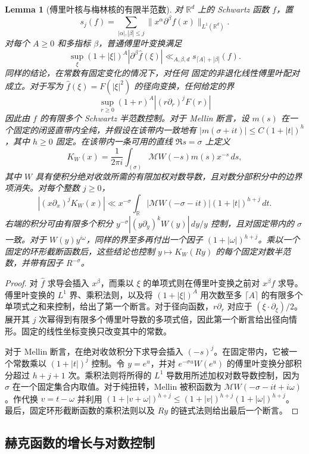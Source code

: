 \documentclass[11pt,a4paper]{article}
\numberwithin{equation}{section}
\numberwithin{figure}{section}
\newtheorem{lemma}[theorem]{Lemma}
\theoremstyle{definition}
\theoremstyle{remark}
\begin{document}
\begin{lemma}[傅里叶核与梅林核的有限半范数]
\label{lem:kernel-seminorms}
对 $\mathbb R^d$ 上的 Schwartz 函数 $f$，置
\[
 s_j(f)=\sum_{|\alpha|,|\beta|\le j}
             \|x^\alpha\partial^\beta f(x)\|_{L^1(\mathbb R^d)}.
\]
对每个 $A\ge0$ 和多指标 $\beta$，普通傅里叶变换满足
\[
 \sup_\xi(1+|\xi|)^A|\partial^\beta\widehat f(\xi)|
 \ll_{A,\beta,d}s_{\lceil A\rceil+|\beta|}(f).
\]
同样的结论，在常数有固定变化的情况下，对任何
固定的非退化线性傅里叶配对成立。对于写为
$\widehat f(\xi)=F(|\xi|^2)$ 的径向变换，任何给定的界
\[
 \sup_{r\ge0}(1+r)^A|(r\partial_r)^jF(r)|
\]
因此由 $f$ 的有限多个 Schwartz 半范数控制。对于 Mellin 断言，设 $m(s)$ 在一个固定的闭竖直带内全纯，并假设在该带内一致地有
$|m(\sigma+it)|\le C(1+|t|)^h$，其中 $h\ge0$ 固定。在该带内一条可用的直线
$\Re s=\sigma$ 上定义
\[
 K_W(x)=\frac1{2\pi i}\int_{(\sigma)}\mathcal MW(-s)m(s)x^{-s}\,ds,
\]
其中 $W$ 具有使积分绝对收敛所需的有限加权对数导数，且对数分部积分中的边界项消失。对每个整数 $j\ge0$，
\[
 |(x\partial_x)^jK_W(x)|
 \ll x^{-\sigma}\int_{\mathbb R}
       |\mathcal MW(-\sigma-it)|(1+|t|)^{h+j}\,dt.
\]
右端的积分可由有限多个积分
$y^{-\sigma}|(y\partial_y)^kW(y)|\,dy/y$ 控制，且对固定带内的 $\sigma$ 一致。对于 $W(y)y^{i\omega}$，同样的界至多再付出一个因子 $(1+|\omega|)^{h+j}$。乘以一个固定的环形截断函数后，这些结论也控制 $y\mapsto K_W(Ry)$ 的每个固定对数半范数，并带有因子 $R^{-\sigma}$。
\end{lemma}

\begin{proof}
对 $\widehat f$ 求导会插入 $x^\beta$，而乘以 $\xi$ 的单项式则在傅里叶变换之前对 $x^\beta f$ 求导。傅里叶变换的 $L^1$ 界、乘积法则，以及将 $(1+|\xi|)^A$ 用次数至多 $\lceil A\rceil$ 的有限多个单项式之和来控制，给出了第一个断言。对于径向函数，$r\partial_r$ 对应于 $(\xi\cdot\partial_\xi)/2$。展开其 $j$ 次幂得到有限多个傅里叶导数的多项式倍，因此第一个断言给出径向情形。固定的线性坐标变换只改变其中的常数。

对于 Mellin 断言，在绝对收敛积分下求导会插入 $(-s)^j$。在固定带内，它被一个常数乘以 $(1+|t|)^j$ 控制。令 $y=e^u$，并对 $e^{-\sigma u}W(e^u)$ 的傅里叶变换分部积分超过 $h+j+1$ 次。乘积法则将所得的 $L^1$ 导数用所述加权对数导数控制，因为 $\sigma$ 在一个固定集合内取值。对于纯扭转，Mellin 被积函数为 $\mathcal MW(-\sigma-it+i\omega)$。作代换
$v=t-\omega$ 并利用
$(1+|v+\omega|)^{h+j}\le(1+|v|)^{h+j}(1+|\omega|)^{h+j}$。
最后，固定环形截断函数的乘积法则以及 $Ry$ 的链式法则给出最后一个断言。
\end{proof}

\subsection{赫克函数的增长与对数控制}
\end{document}
